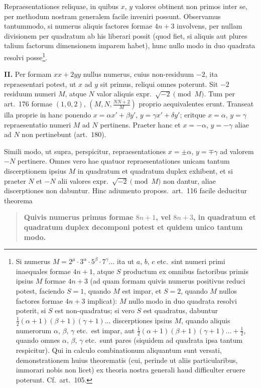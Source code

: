 \documentclass[12pt,a4paper]{article}
\theoremstyle{plain}
\begin{document}
Repraesentationes reliquae, in quibus $x$, $y$ valores obtinent non primos inter se, per methodum nostram generalem facile inveniri possunt. Observamus tantummodo, si numerus aliquis factores formae $4n+3$ involvens, per nullam divisionem per quadratum ab his liberari possit (quod fiet, si aliquis aut plures talium factorum dimensionem imparem habet), hunc nullo modo in duo quadrata resolvi posse\footnote{Si numerus $M = 2^\mu \cdot 3^\alpha \cdot 5^\beta \cdot 7^\gamma \ldots$ ita ut $a$, $b$, $c$ etc.~sint numeri primi inaequales formae $4n+1$, atque $S$ productum ex omnibus factoribus primis ipsius $M$ formae $4n+3$ (ad quam formam quivis numerus positivus reduci potest, faciendo $S = 1$, quando $M$ est impar, et $S = 2$, quando $M$ nullos factores formae $4n+3$ implicat): $M$ nullo modo in duo quadrata resolvi poterit, si $S$ est non-quadratus; si vero $S$ est quadratus, dabuntur $\frac{1}{2}(\alpha+1)(\beta+1)(\gamma+1)\ldots$ discerptiones ipsius $M$, quando aliquis numerorum $\alpha$, $\beta$, $\gamma$ etc.~est impar, aut $\frac{1}{2}(\alpha+1)(\beta+1)(\gamma+1)\ldots + \frac{1}{2}$, quando omnes $\alpha$, $\beta$, $\gamma$ etc.~sunt pares (siquidem ad quadrata ipsa tantum respicitur). Qui in calculo combinationum aliquantum sunt versati, demonstrationem huius theorematis (cui, perinde ut aliis particularibus, immorari nobis non licet) ex theoria nostra generali haud difficulter eruere poterunt. Cf.~art.~105.}.

\textbf{II.} Per formam $xx + 2yy$ nullus numerus, cuius non-residuum $-2$, ita repraesentari potest, ut $x$ ad $y$ sit primus, reliqui omnes poterunt. Sit $-2$ residuum numeri $M$, atque $N$ valor aliquis expr.~$\sqrt{-2} \pmod{M}$. Tum per art.~176 formae $(1,0,2)$, $(M,N,\frac{NN+2}{M})$ proprio aequivalentes erunt. Transeat illa proprie in hanc ponendo $x = \alpha x' + \beta y'$, $y = \gamma x' + \delta y'$; eritque $x = \alpha$, $y = \gamma$ repraesentatio numeri $M$ ad $N$ pertinens. Praeter hanc et $x = -\alpha$, $y = -\gamma$ aliae ad $N$ non pertinebunt (art.~180).

Simili modo, ut supra, perspicitur, repraesentationes $x = \pm\alpha$, $y = \mp\gamma$ ad valorem $-N$ pertinere. Omnes vero hae quatuor repraesentationes unicam tantum discerptionem ipsius $M$ in quadratum et quadratum duplex exhibent, et si praeter $N$ et $-N$ alii valores expr.~$\sqrt{-2} \pmod{M}$ non dantur, aliae discerptiones non dabuntur. Hinc adiumento proposs.~art.~116 facile deducitur theorema

\begin{quote}
\textbf{Quivis numerus primus formae $8n+1$, vel $8n+3$, in quadratum et quadratum duplex decomponi potest et quidem unico tantum modo.}
\end{quote}
\end{document}
